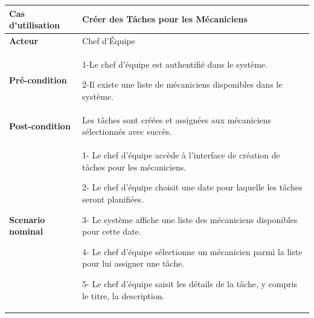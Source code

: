 \begin{table}[H]
  \centering
  \renewcommand{\arraystretch}{1} %
  \begin{tabular}{|p{4cm}|p{9cm}|}
    \hline
    \textbf{Cas d'utilisation} & Créer des Tâches pour les Mécaniciens                                                        \\
    \hline
    \textbf{Acteur}            & Chef d'Équipe                                                                                \\
    \hline
    \textbf{Pré-condition}     & 1-Le chef d'équipe est authentifié dans le système.\newline

    2-Il existe une liste de mécaniciens disponibles dans le système.                                                         \\
    \hline
    \textbf{Post-condition}    & Les tâches sont créées et assignées aux mécaniciens sélectionnés avec succès.                \\
    \hline
    \textbf{Scenario nominal}  & 1- Le chef d'équipe accède à l'interface de création de tâches pour les mécaniciens.\newline


    2- Le chef d'équipe choisit une date pour laquelle les tâches seront planifiées.\newline

    3- Le système affiche une liste des mécaniciens disponibles pour cette date. \newline

    4- Le chef d'équipe sélectionne un mécanicien parmi la liste pour lui assigner une tâche.\newline

    5- Le chef d'équipe saisit les détails de la tâche, y compris le titre, la description.                                   \\
  \end{tabular}

\end{table}


